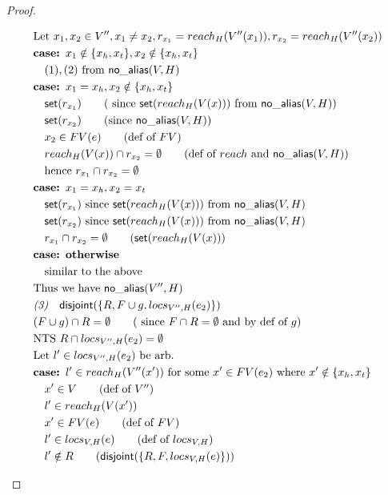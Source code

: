 \documentclass[sigconf]{acmart}
\newcommand{\ms}[1]{\ensuremath{\mathsf{#1}}}
\newcommand{\na}[1]{\mathsf{no\_alias}(#1)}
\newcommand{\dist}[1]{\mathsf{disjoint}(#1)}
\theoremstyle{definition}
\begin{document}
\begin{proof}
\begin{description}
\begin{align*}
  &\text{Let } x_1, x_2 \in V'', x_1 \ne x_2, r_{x_1} = reach_H(V''(x_1)), r_{x_2} = reach_H(V''(x_2))\\
  & \textbf{case: } x_1 \notin \{x_h,x_t\}, x_2 \notin \{x_h,x_t\}\\
  &\quad (1), (2) \text{ from } \na{V,H}\\
  & \textbf{case: } x_1 = x_h, x_2 \notin \{x_h,x_t\}\\
  &\quad \ms{set}(r_{x_1}) \tag{ since $\ms{set}(reach_H(V(x)))$ from  $\na{V,H}$}\\
  &\quad \ms{set}(r_{x_2}) \tag{since  $\na{V,H}$}\\
  &\quad x_2 \in FV(e) \tag{def of $FV$}\\
  &\quad reach_H(V(x)) \cap r_{x_2} = \emptyset \tag{def of $reach$ and $\na{V,H}$}\\
  &\quad \text{hence } r_{x_1} \cap r_{x_2} = \emptyset\\
  &\textbf{case: } x_1 = x_h, x_2 = x_t\\
  &\quad \ms{set}(r_{x_1}) \text{ since } \ms{set}(reach_{H}(V(x))) \text{ from } \na{V,H}\\
  &\quad \ms{set}(r_{x_2}) \text{ since } \ms{set}(reach_H(V(x))) \text{ from } \na{V,H}\\
  &\quad r_{x_1} \cap r_{x_2} = \emptyset \tag{$\ms{set}(reach_H(V(x))$}\\
  & \textbf{case: otherwise} \\
  &\quad \text{similar to the above}\\
  &\text{Thus we have } \na{V'',H}\\
  &\emph{(3)}\quad \dist{\{R,F \cup g,locs_{V'',H}(e_2)\}}\\
  &(F \cup g) \cap R = \emptyset \tag{ since $F \cap R = \emptyset$ and by def of $g$}\\
  &\text{NTS } R \cap locs_{V'',H}(e_2) = \emptyset\\
  &\text{Let } l' \in locs_{V'',H}(e_2) \text{ be arb.}\\
  &\textbf{case: }  l' \in reach_{H}(V''(x')) \text{ for some $x' \in FV(e_2)$ where } x' \notin \{x_h,x_t\}\\
  &\quad x' \in V \tag{def of $V''$}\\
  &\quad l' \in reach_{H}(V(x'))\\
  &\quad x' \in FV(e) \tag{def of $FV$}\\
  &\quad l' \in locs_{V,H}(e) \tag{def of $locs_{V,H}$}\\
  &\quad l' \notin R \tag{$\dist{\{R,F,locs_{V,H}(e)\}}$}\\

\end{align*}
\end{description}
\end{proof}
\end{document}
